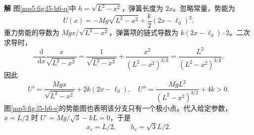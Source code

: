 \documentclass[11pt,openany,fontset=fandol]{ctexbook}
\theoremstyle{definition}\newtheorem{example}{例}[chapter]\newtheorem{exercise}{习题}[chapter]
\newcommand{\SolutionStart}{\par\medskip\ifdim\pagetotal>0pt\ifdim\dimexpr\pagegoal-\pagetotal\relax<3\baselineskip\newpage\fi\fi\noindent\textbf{解}\quad\ignorespaces}
\newenvironment{solution}{\SolutionStart}{\par\medskip}
\newcommand{\dd}{\mathop{}\!\mathrm d}\newcommand{\ee}{\mathrm e}\newcommand{\vct}[1]{\bm{#1}}
\begin{document}
\begin{solution}
图\ref{mp5:fig:l5-h6-q}中 $h=\sqrt{L^2-x^2}$，弹簧长度为 $2x$。忽略常量，势能为
\[
U(x)=-Mg\sqrt{L^2-x^2}+\frac k2(2x-\ell_0)^2.
\]
重力势能的导数为 $Mgx/\sqrt{L^2-x^2}$，弹簧项的链式导数为 $k(2x-\ell_0)\cdot2$。二次求导时，
\[
\frac{\dd}{\dd x}\frac{x}{\sqrt{L^2-x^2}}
=\frac1{\sqrt{L^2-x^2}}+\frac{x^2}{(L^2-x^2)^{3/2}}
=\frac{L^2}{(L^2-x^2)^{3/2}}.
\]
因此
\[
U'=\frac{Mgx}{\sqrt{L^2-x^2}}+2k(2x-\ell_0),
\quad U''=\frac{MgL^2}{(L^2-x^2)^{3/2}}+4k>0.
\]
图\ref{mp5:fig:l5-h6-s}的势能图也表明该分支只有一个极小点。代入给定参数，$x=L/2$ 时 $U'=Mg/\sqrt3-kL=0$，于是
\[
\boxed{x_e=L/2,\qquad h_e=\sqrt3 L/2.}
\]

\begin{figure}[H]\centering
{}
\end{figure}
\end{solution}
\end{document}
